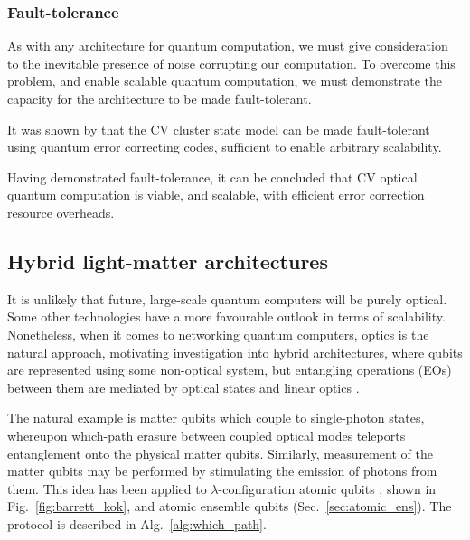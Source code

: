 
\subsubsection{Fault-tolerance}

As with any architecture for quantum computation, we must give consideration to the inevitable presence of noise corrupting our computation. To overcome this problem, and enable scalable quantum computation, we must demonstrate the capacity for the architecture to be made fault-tolerant.

It was shown by \cite{bib:PhysRevLett.100.030503} that the CV cluster state model can be made fault-tolerant using quantum error correcting codes, sufficient to enable arbitrary scalability.

Having demonstrated fault-tolerance, it can be concluded that CV optical quantum computation is viable, and scalable, with efficient error correction resource overheads.

%
%

\subsection{Hybrid light-matter architectures} \label{sec:hybrid} 

It is unlikely that future, large-scale quantum computers will be purely optical. Some other technologies have a more favourable outlook in terms of scalability. Nonetheless, when it comes to networking quantum computers, optics is the natural approach, motivating investigation into hybrid architectures, where qubits are represented using some non-optical system, but entangling operations (EOs) between them are mediated by optical states and linear optics \cite{bib:Duan06, bib:Beugnon06}.

The natural example is matter qubits which couple to single-photon states, whereupon which-path erasure between coupled optical modes teleports entanglement onto the physical matter qubits. Similarly, measurement of the matter qubits may be performed by stimulating the emission of photons from them. This idea has been applied to $\lambda$-configuration atomic qubits \cite{bib:BarrettKok05}, shown in Fig.~\ref{fig:barrett_kok}, and atomic ensemble qubits \cite{bib:RohdeAtEns10} (Sec.~\ref{sec:atomic_ens}). The protocol is described in Alg.~\ref{alg:which_path}.

